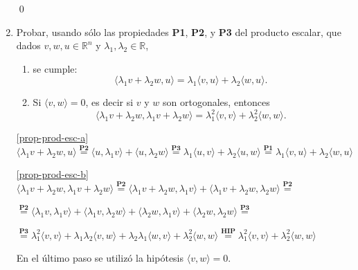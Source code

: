 \begin{enumerate}[topsep=6pt, itemsep=.4cm]
\qed

\item Probar, usando sólo las propiedades \textbf{P1}, \textbf{P2}, y \textbf{P3} del producto escalar, que dados $v, w, u \in \mathbb R^n$ y $\lambda_1, \lambda_2 \in \mathbb R$, 
\begin{enumerate}
    \item\label{prop-prod-esc-a} se cumple:
    \begin{equation*}
    \langle \lambda_1 v + \lambda_2 w , u  \rangle =  \lambda_1\langle v , u  \rangle +   \lambda_2\langle w , u  \rangle.
    \end{equation*}
    \item\label{prop-prod-esc-b}  Si $\langle v , w  \rangle =0$, es decir si $v$ y $w$ son ortogonales,  entonces
    \begin{equation*}
        \langle \lambda_1 v + \lambda_2 w ,  \lambda_1 v + \lambda_2 w   \rangle =
        \lambda_1^2 \langle  v ,  v  \rangle + \lambda_2^2 \langle w,w  \rangle.
    \end{equation*}
\end{enumerate}

\rta 


\ref{prop-prod-esc-a} $\langle \lambda_1 v + \lambda_2 w , u  \rangle \overset{\textbf{P2}}{=} \langle u , \lambda_1 v \rangle + \langle u , \lambda_2 w \rangle \overset{\textbf{P3}}{=} \lambda_1 \langle u,v \rangle + \lambda_2 \langle u,w \rangle \overset{\textbf{P1}}{=} \lambda_1 \langle v,u \rangle + \lambda_2 \langle w,u \rangle$

\ref{prop-prod-esc-b} $ \langle \lambda_1 v + \lambda_2 w, \lambda_1 v + \lambda_2 w \rangle \overset{\textbf{P2}}{=} \langle \lambda_1 v + \lambda_2 w, \lambda_1 v \rangle + \langle \lambda_1 v + \lambda_2 w, \lambda_2 w \rangle \overset{\textbf{P2}}{=} $

$ \overset{\textbf{P2}}{=} \langle \lambda_1 v , \lambda_1 v \rangle + \langle \lambda_1 v, \lambda_2 w \rangle + \langle \lambda_2 w, \lambda_1 v \rangle + \langle \lambda_2 w, \lambda_2 w \rangle \overset{\textbf{P3}}{=} $

$ \overset{\textbf{P3}}{=} \lambda_1^2 \langle v , v \rangle + \lambda_1 \lambda_2 \langle v, w \rangle + \lambda_2 \lambda_1 \langle w, v \rangle + \lambda_2^2 \langle w, w \rangle \overset{\textbf{HIP}}{=} \lambda_1^2 \langle v , v \rangle + \lambda_2^2 \langle w, w \rangle $

En el último paso se utilizó la hipótesis $\langle v , w  \rangle =0$.


\end{enumerate}

